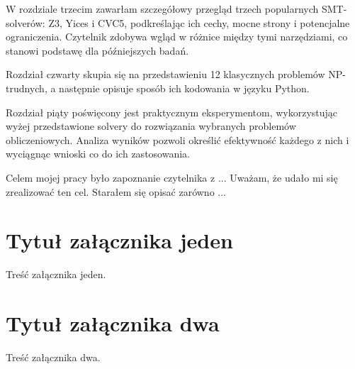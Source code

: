 \documentclass[xodstep]{wnspt}
\begin{document}
W rozdziale trzecim zawarłam szczegółowy przegląd trzech popularnych SMT-solverów: Z3, Yices i CVC5, podkreślając ich cechy, mocne strony i potencjalne ograniczenia. Czytelnik zdobywa wgląd w różnice między tymi narzędziami, co stanowi podstawę dla późniejszych badań.

Rozdział czwarty skupia się na przedstawieniu 12 klasycznych problemów NP-trudnych, a następnie opisuje sposób ich kodowania w języku Python.

Rozdział piąty poświęcony jest praktycznym eksperymentom, wykorzystując wyżej przedstawione solvery do rozwiązania wybranych problemów obliczeniowych. Analiza wyników pozwoli określić efektywność każdego z nich i wyciągnąc wnioski co do ich zastosowania.








\summary
Celem mojej pracy było zapoznanie czytelnika z ... 
Uważam, że udało mi się zrealizować ten cel. Starałem się opisać zarówno ...

\appendix
\chapter{Tytuł załącznika jeden}
Treść załącznika jeden.

\chapter{Tytuł załącznika dwa}
Treść załącznika dwa.

%
%

\printbibliography[type=article,title={Bibliografia - artykuły}]
\printbibliography[filter=books_and_proceedings,title={Bibliografia - książki  i referaty konferencyjne}]
\printbibliography[type=misc,title={Bibliografia - strony internetowe}]

\listoftables 

\listoffigures

\lstlistoflistings
\end{document}
